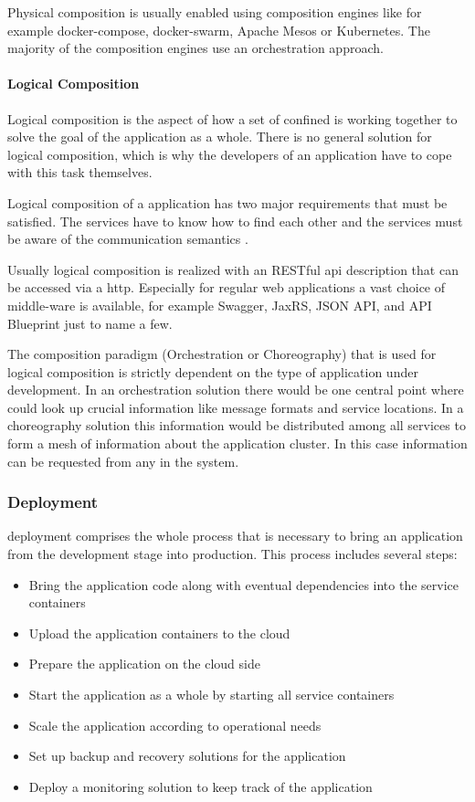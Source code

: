 Physical composition is usually enabled using composition engines like for
example docker-compose, docker-swarm, Apache Mesos or Kubernetes. The majority
of the composition engines use an orchestration approach. 

\paragraph{Logical Composition}

Logical composition is the aspect of how a set of confined \mss{} is working
together to solve the goal of the application as a whole. There is no
general solution for logical composition, which is why the developers of an
application have to cope with this task themselves.

Logical composition of a \ms{} application has two major requirements that must
be satisfied. The services have to know how to find each other
\cite{rotter2017telecom} and the services must be aware of the communication
semantics \cite{oberhauser2016microflows}.

Usually logical composition is realized with an RESTful \gls{api} description
that can be accessed via a \gls{http}. Especially for regular web applications a
vast choice of middle-ware is available, for example Swagger, JaxRS, JSON API,
and API Blueprint just to name a few.

The composition paradigm (Orchestration or Choreography) that is used for
logical composition is strictly dependent on the type of application under
development. In an orchestration solution there would be one central point where
\mss{} could look up crucial information like message formats and service
locations. In a choreography solution this information would be distributed
among all services to form a mesh of information about the application cluster.
In this case information can be requested from any \ms{} in the system.

\subsubsection{\ms{} Deployment}

\ms{} deployment comprises the whole process that is necessary to bring an
application from the development stage into production. This process includes
several steps:

\begin{itemize}
  \item Bring the application code along with eventual dependencies into the
  service containers
  \item Upload the application containers to the cloud
  \item Prepare the application on the cloud side
  \item Start the application as a whole by starting all service containers
  \item Scale the application according to operational needs
  \item Set up backup and recovery solutions for the application
  \item Deploy a monitoring solution to keep track of the application
\end{itemize}

